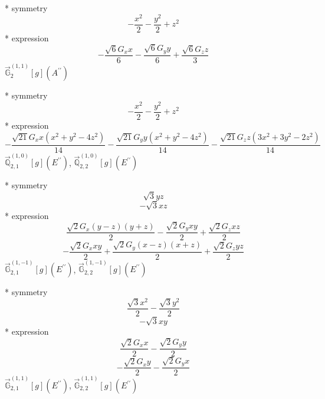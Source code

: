 \documentclass[fleqn,8pt]{jsarticle}
\begin{document}
\noindent\quad ** symmetry
\begin{dmath*}
- \frac{x^{2}}{2} - \frac{y^{2}}{2} + z^{2}
\end{dmath*}
\noindent\quad ** expression
\begin{dmath*}
- \frac{\sqrt{6} G_{x} x}{6} - \frac{\sqrt{6} G_{y} y}{6} + \frac{\sqrt{6} G_{z} z}{3}
\end{dmath*}
\noindent\quad $\vec{\mathbb{G}}_{2}^{(1,1)}[g](A^{\prime\prime})$

\noindent\quad ** symmetry
\begin{dmath*}
- \frac{x^{2}}{2} - \frac{y^{2}}{2} + z^{2}
\end{dmath*}
\noindent\quad ** expression
\begin{dmath*}
- \frac{\sqrt{21} G_{x} x \left(x^{2} + y^{2} - 4 z^{2}\right)}{14} - \frac{\sqrt{21} G_{y} y \left(x^{2} + y^{2} - 4 z^{2}\right)}{14} - \frac{\sqrt{21} G_{z} z \left(3 x^{2} + 3 y^{2} - 2 z^{2}\right)}{14}
\end{dmath*}
\noindent\quad $\vec{\mathbb{Q}}_{2,1}^{(1,0)}[g](E^{\prime\prime})$, $\vec{\mathbb{Q}}_{2,2}^{(1,0)}[g](E^{\prime\prime})$

\noindent\quad ** symmetry
\begin{dmath*}
\sqrt{3} y z
\end{dmath*}
\begin{dmath*}
- \sqrt{3} x z
\end{dmath*}
\noindent\quad ** expression
\begin{dmath*}
\frac{\sqrt{2} G_{x} \left(y - z\right) \left(y + z\right)}{2} - \frac{\sqrt{2} G_{y} x y}{2} + \frac{\sqrt{2} G_{z} x z}{2}
\end{dmath*}
\begin{dmath*}
- \frac{\sqrt{2} G_{x} x y}{2} + \frac{\sqrt{2} G_{y} \left(x - z\right) \left(x + z\right)}{2} + \frac{\sqrt{2} G_{z} y z}{2}
\end{dmath*}
\noindent\quad $\vec{\mathbb{G}}_{2,1}^{(1,-1)}[g](E^{\prime\prime})$, $\vec{\mathbb{G}}_{2,2}^{(1,-1)}[g](E^{\prime\prime})$

\noindent\quad ** symmetry
\begin{dmath*}
\frac{\sqrt{3} x^{2}}{2} - \frac{\sqrt{3} y^{2}}{2}
\end{dmath*}
\begin{dmath*}
- \sqrt{3} x y
\end{dmath*}
\noindent\quad ** expression
\begin{dmath*}
\frac{\sqrt{2} G_{x} x}{2} - \frac{\sqrt{2} G_{y} y}{2}
\end{dmath*}
\begin{dmath*}
- \frac{\sqrt{2} G_{x} y}{2} - \frac{\sqrt{2} G_{y} x}{2}
\end{dmath*}
\noindent\quad $\vec{\mathbb{G}}_{2,1}^{(1,1)}[g](E^{\prime\prime})$, $\vec{\mathbb{G}}_{2,2}^{(1,1)}[g](E^{\prime\prime})$
\end{document}

